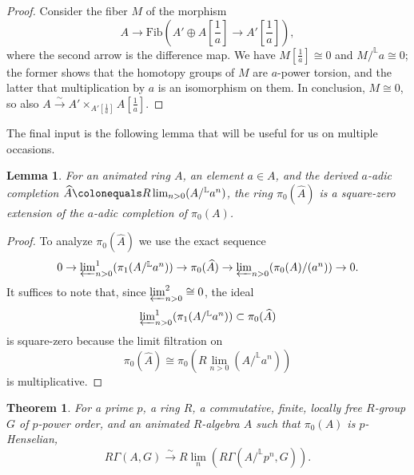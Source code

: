 \documentclass[11pt, reqno]{amsart}
\newcommand{\bL}{\mathbb{L}}
\DeclareMathOperator{\Cone}{Cone}		%
\newcommand{\ce}{\colonequals}
\newcommand{\isomto}{\overset{\sim}{\longrightarrow}}
\providecommand{\p}[1]{\left(#1\right)}
\newcommand{\ra}{\rightarrow}
\newcommand{\wh}{\widehat}
\providecommand{\up}[1]{{\upshape(}#1{\upshape)}}
\providecommand{\f}[2]{\frac{#1}{#2}}
\newcommand{\blem}{\begin{lemma}}
\newcommand{\elem}{\end{lemma}}
\newcommand{\x}{\text}
\providecommand{\qxq}[1]{\quad\text{#1}\quad}
\newcommand{\q}{\quad}
\newcommand{\tst}{\textstyle}
\newcommand{\be}{\begin{equation}}
\newcommand{\ee}{\end{equation}}
\newcommand{\bpf}{\begin{proof}}
\newcommand{\epf}{\end{proof}}
\numberwithin{equation}{numberingbase}
\theoremstyle{thms}
\newtheorem{lemma}[numberingbase]{Lemma}
\newtheorem{theorem}[numberingbase]{Theorem}
\theoremstyle{claims}
\theoremstyle{defs}
\theoremstyle{thms}
\theoremstyle{defs}
\theoremstyle{subsection-tweak}
\theoremstyle{subsection-tweak}
\begin{document}
\bpf
Consider the fiber $M$ of the morphism 
\[
\tst A \ra \mathrm{Fib}\p{A' \oplus A[\f{1}{a}] \ra A'[\f{1}{a}]},
\]
where the second arrow is the difference map. We have $M[\f{1}{a}] \cong 0$ and $M/^\bL a \cong 0$; the former shows that the homotopy groups of $M$ are $a$-power torsion, and the latter that multiplication by $a$ is an isomorphism on them. In conclusion, $M \cong 0$, so also $A \isomto A'\times_{A'[\f{1}{a}]} A[\f{1}{a}]$. 
\epf




The final input is the following lemma that will be useful for us on multiple occasions.

\blem \label{lem:sq-0-trick}
For an animated ring $A$, an element $a \in A$, and the derived $a$-adic completion $\wh{A} \ce R\lim_{n > 0}(A/^\bL a^n)$, the ring $\pi_0(\wh{A})$ is a square-zero extension of the $a$-adic completion of $\pi_0(A)$. 
\elem

\bpf
To analyze $\pi_0(\wh{A})$ we use the exact sequence 
\[
\tst 0 \ra \varprojlim_{n > 0}^1 (\pi_1(A/^\bL a^n)) \ra \pi_0(\wh{A}) \ra \varprojlim_{n > 0} (\pi_0(A)/(a^n)) \ra 0.
\]
It suffices to note that, since $\varprojlim_{n > 0}^2 \cong 0$, the ideal 
\[
\tst \varprojlim_{n > 0}^1 (\pi_1(A/^\bL a^n)) \subset \pi_0(\wh{A})
\]
is square-zero because the limit filtration on 
\[
\tst \pi_0(\wh{A}) \cong \pi_0(R\lim_{n > 0}(A/^\bL a^n))
\]
 is multiplicative.
\epf





\begin{theorem}\label{thm:padiclimit} 
For a prime $p$, a ring $R$, a commutative, finite, locally free $R$-group $G$ of $p$-power order, and an animated $R$-algebra $A$ such that $\pi_0(A)$ is $p$-Henselian, 
\be \label{eqn:continuity-formula}
\tst R\Gamma(A,G)\isomto R\lim_n (R\Gamma(A/^\bL p^n,G)).
\ee
\end{theorem}
\end{document}
